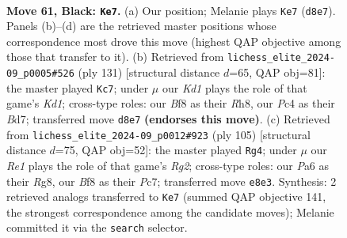 \documentclass[11pt]{article}
\begin{document}
\begin{figure}[p]\centering
\begin{subfigure}{0.46\textwidth}\centering
\resizebox{\linewidth}{!}{%
\newchessgame
\chessboard[
  setfen={3krb2/6p1/p1p4r/Pp1b1p1p/2p2P1P/2B1P1P1/1P2K2N/1R4R1 b - - 24 61},
  showmover=false,
  pgfstyle=straightmove, color=movearrow, markmove={d8-e7}
]}
\caption{}
\end{subfigure}\hfill
\begin{subfigure}{0.46\textwidth}\centering
\resizebox{\linewidth}{!}{%
\newchessgame
\chessboard[
  setfen={2rk3r/3b1p2/4p1p1/1p1pP2p/pP3P2/P1P1K1P1/2R1B2P/3R4 b - - 72 66},
  showmover=false,
  pgfstyle=straightmove, color=movearrow, markmove={d8-c7}
]}
\caption{}
\end{subfigure}
\\[4pt]
\begin{subfigure}{0.46\textwidth}\centering
\resizebox{\linewidth}{!}{%
\newchessgame
\chessboard[
  setfen={3bk1r1/2p3r1/1p1p4/p2PpP1R/P1P5/1P2BKP1/8/6R1 b - - 4 53},
  showmover=false,
  pgfstyle=straightmove, color=movearrow, markmove={g7-g4}
]}
\caption{}
\end{subfigure}\hfill

\caption{\textbf{Move 61, Black: \texttt{Ke7}.} (a) Our position; Melanie plays \texttt{Ke7} (\texttt{d8e7}). Panels (b)--(d) are the retrieved master positions whose correspondence most drove this move (highest QAP objective among those that transfer to it). (b) Retrieved from \texttt{lichess\_elite\_2024-09\_p0005\#526} (ply 131) [structural distance $d$=65, QAP obj=81]: the master played \texttt{Kc7}; under $\mu$ our \emph{Kd1} plays the role of that game's \emph{Kd1}; cross-type roles: our \emph{B}f8 as their \emph{R}h8, our \emph{P}c4 as their \emph{B}d7; transferred move \texttt{d8e7} \textbf{(endorses this move)}. (c) Retrieved from \texttt{lichess\_elite\_2024-09\_p0012\#923} (ply 105) [structural distance $d$=75, QAP obj=52]: the master played \texttt{Rg4}; under $\mu$ our \emph{Re1} plays the role of that game's \emph{Rg2}; cross-type roles: our \emph{P}a6 as their \emph{R}g8, our \emph{B}f8 as their \emph{P}c7; transferred move \texttt{e8e3}. Synthesis: 2 retrieved analogs transferred to \texttt{Ke7} (summed QAP objective 141, the strongest correspondence among the candidate moves); Melanie committed it via the \texttt{search} selector.}
\label{fig:thought-m121}
\end{figure}

\clearpage
\end{document}
